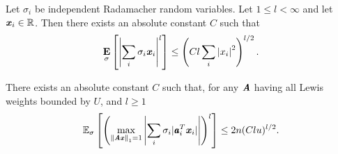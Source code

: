 \begin{lemma}[Khintchine]
Let $\sigma_i$ be independent Radamacher random variables.
Let $1 \leq l < \infty$  and let $\xx_i \in \Re$. Then there exists an absolute constant $C$ such that
\begin{equation*}
\expct{\sigma}{ \left | \sum_{i} \sigma_i \xx_i \right |^{l}}
\leq \left(Cl \sum_{i} \left| x_i \right|^2 \right)^{l/2}.
\end{equation*}
\end{lemma}

\begin{lemma}
\label{lem:momBound}
There exists an absolute constant $C$ such that, for any $\AA$ having all Lewis weights bounded by $U$, and $l \geq 1$
\begin{equation*}
\expec{\sigma}{\left (\max_{\norm{\AA \xx}_1 = 1} \left | \sum_i \sigma_i |\aa_i^T \xx_i| \right | \right )^l} \leq 2n (Clu)^{l/2}.
\end{equation*}
\end{lemma}

